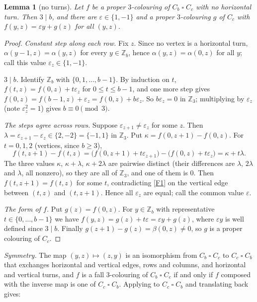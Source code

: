 \documentclass[11pt]{article}
\theoremstyle{plain}
\newtheorem{lemma}[lemma]{Lemma}
\theoremstyle{definition}
\theoremstyle{remark}
\newcommand{\Z}{\mathbb{Z}}
\newcommand{\T}{\mathbin{\square}}
\begin{document}
\begin{lemma}[no turns]\label{lem:no-turns}
Let $f$ be a proper $3$-colouring of $C_b \T C_c$ with no horizontal turn. Then $3 \mid b$, and
there are $\varepsilon \in \{1, -1\}$ and a proper $3$-colouring $g$ of $C_c$ with
$f(y,z) = \varepsilon y + g(z)$ for all $(y,z)$.
\end{lemma}

\begin{proof}
\emph{Constant step along each row.} Fix $z$. Since no vertex is a horizontal turn,
$\alpha(y - 1, z) = \alpha(y, z)$ for every $y \in \Z_b$, hence $\alpha(y, z) = \alpha(0, z)$
for all $y$; call this value $\varepsilon_z \in \{1, -1\}$.

\emph{$3 \mid b$.} Identify $\Z_b$ with $\{0, 1, \dots, b-1\}$. By induction on $t$,
$f(t, z) = f(0, z) + t\varepsilon_z$ for $0 \le t \le b - 1$, and one more step gives
$f(0, z) = f(b-1, z) + \varepsilon_z = f(0, z) + b\varepsilon_z$. So $b\varepsilon_z = 0$ in
$\Z_3$; multiplying by $\varepsilon_z$ (note $\varepsilon_z^2 = 1$) gives $b \equiv 0
\pmod 3$.

\emph{The steps agree across rows.} Suppose $\varepsilon_{z+1} \ne \varepsilon_z$ for some
$z$. Then $\lambda = \varepsilon_{z+1} - \varepsilon_z \in \{2, -2\} = \{-1, 1\}$ in $\Z_3$.
Put $\kappa = f(0, z+1) - f(0, z)$. For $t = 0, 1, 2$ (vertices, since $b \ge 3$),
\[
f(t, z+1) - f(t, z) = \bigl(f(0,z+1) + t\varepsilon_{z+1}\bigr) - \bigl(f(0,z) +
t\varepsilon_z\bigr) = \kappa + t\lambda .
\]
The three values $\kappa$, $\kappa + \lambda$, $\kappa + 2\lambda$ are pairwise distinct
(their differences are $\lambda$, $2\lambda$ and $\lambda$, all nonzero), so they are all of
$\Z_3$, and one of them is $0$. Then $f(t, z+1) = f(t, z)$ for some $t$, contradicting
\ref{F1} on the vertical edge between $(t,z)$ and $(t, z+1)$. Hence all $\varepsilon_z$ are
equal; call the common value $\varepsilon$.

\emph{The form of $f$.} Put $g(z) = f(0, z)$. For $y \in \Z_b$ with representative
$t \in \{0, \dots, b-1\}$ we have $f(y, z) = g(z) + t\varepsilon = \varepsilon y + g(z)$, where
$\varepsilon y$ is well defined since $3 \mid b$. Finally $g(z+1) - g(z) = \beta(0, z) \ne 0$,
so $g$ is a proper colouring of $C_c$.
\end{proof}

\emph{Symmetry.} The map $(y,z) \mapsto (z,y)$ is an isomorphism from $C_b \T C_c$ to
$C_c \T C_b$ that exchanges horizontal and vertical edges, rows and columns, and
horizontal and vertical turns, and $f$ is a fall $3$-colouring of $C_b \T C_c$ if and only if
$f$ composed with the inverse map is one of $C_c \T C_b$. Applying
 to $C_c \T C_b$ and translating back gives:
\end{document}
